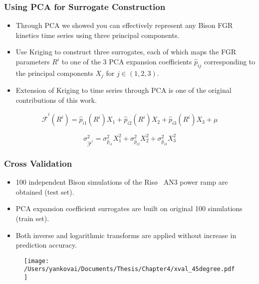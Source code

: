 \begin{frame}
\frametitle{Using PCA for Surrogate Construction}

\begin{itemize}
  \item Through PCA we showed you can effectively represent any Bison FGR kinetics time series using three principal components.
  \item Use Kriging to construct three surrogates, each of which maps the FGR parameters $R^i$ to one of the 3 PCA expansion coefficients $\hat{p}_{ij}$ corresponding to the principal components $X_j$ for $j\in\left(1,2,3\right)$.
  \item Extension of Kriging to time series through PCA is one of the original contributions of this work.
\end{itemize}

\begin{equation}
 \hat{\mathcal{F}}^{i}(R^i) = \hat{p}_{i1}\left(R^i\right) X_1 + \hat{p}_{i2}\left(R^i\right) X_2 + \hat{p}_{i3}\left(R^i\right) X_3 + \mu \nonumber  
\end{equation}

\begin{equation}
 \sigma_{ \hat{\mathcal{F}}^i }^2 = \sigma_{\hat{p}_{i1}}^2 X_1^2 + \sigma_{\hat{p}_{i2}}^2 X_2^2 + \sigma_{\hat{p}_{i3}}^2 X_3^2  \nonumber
\end{equation}

\end{frame}
\begin{frame}
\frametitle{Cross Validation}

\begin{itemize}
  \item 100 independent Bison simulations of the Ris\o~ AN3 power ramp are obtained (test set).
  \item PCA expansion coefficient surrogates are built on original 100 simulations (train set). 
  \item Both inverse and logarithmic transforms are applied without increase in prediction accuracy.
\end{itemize}

\begin{figure}
  \texttt{[image: /Users/yankovai/Documents/Thesis/Chapter4/xval\_45degree.pdf]}
\end{figure}

\end{frame}
